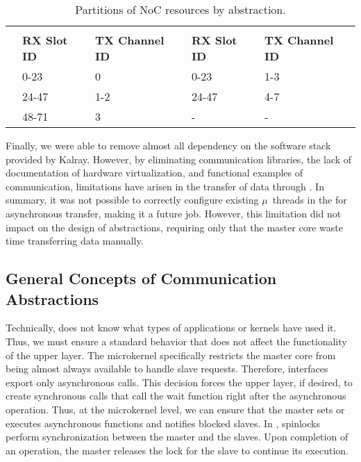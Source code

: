 			\begin{table}[!tb]
				\centering%
				\caption{Partitions of NoC resources by abstraction.}%
				\label{tab.noc-resources}%

				\begin{tabular}{l|l|l|l|l|}
					\cline{2-5}
															& \multicolumn{2}{c|}{\textbf{\cnoc}}          & \multicolumn{2}{c|}{\textbf{\dnoc}}          \\ \cline{2-5}
															& \textbf{RX Slot ID} & \textbf{TX Channel ID} & \textbf{RX Slot ID} & \textbf{TX Channel ID} \\ \hline
					\multicolumn{1}{|l|}{\textbf{\mailbox}} & 0-23                & 0                      & 0-23                & 1-3                    \\ \hline
					\multicolumn{1}{|l|}{\textbf{\portal}}  & 24-47               & 1-2                    & 24-47               & 4-7                    \\ \hline
					\multicolumn{1}{|l|}{\textbf{\sync}}    & 48-71               & 3                      & -                   & -                      \\ \hline
				\end{tabular}

			\end{table}

			Finally, we were able to remove almost all dependency on the software
			stack provided by Kalray. However, by eliminating communication
			libraries, the lack of documentation of hardware virtualization,
			and functional examples of communication, limitations have arisen
			in the transfer of data through \dnoc. In summary, it was not possible
			to correctly configure existing $\mu$~threads in the \dma for asynchronous
			transfer, making it a future job. However, this limitation did not
			impact on the design of abstractions, requiring only that the master
			core waste time transferring data manually.

		\subsection{General Concepts of Communication Abstractions}
		\label{sec.general-concepts}

			Technically, \nanvix \hal does not know what types of applications
			or kernels have used it. Thus, we must ensure a standard behavior
			that does not affect the functionality of the upper layer. The
			microkernel specifically restricts the master core from being
			almost always available to handle slave requests. Therefore,
			interfaces export only asynchronous calls. This decision forces
			the upper layer, if desired, to create synchronous calls that
			call the wait function right after the asynchronous operation.
			Thus, at the microkernel level, we can ensure that the master
			sets or executes asynchronous functions and notifies blocked
			slaves. In \mppa, spinlocks perform synchronization between the
			master and the slaves. Upon completion of an operation, the master
			releases the lock for the slave to continue its execution.

